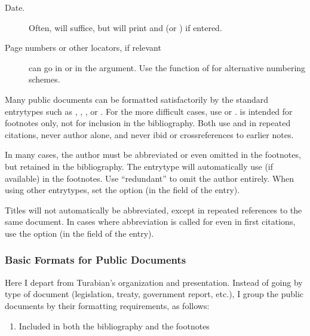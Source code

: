 \documentclass{ltxdockit}[2010/02/12]
\begin{document}
{\begin{description}
\item[Date.] Often,  will suffice, but  will print  and  (or ) if entered.

\item[Page numbers or other locators, if relevant] can go in  or in the  argument. Use the  function of  for alternative numbering schemes.

\end{description}


Many public documents can be formatted satisfactorily by the standard entrytypes such as , , , or . For the more difficult cases, use  or .   is intended for footnotes only, not for inclusion in the bibliography. Both use  and  in repeated citations, never author alone, and never ibid or crossreferences to earlier notes.


In many cases, the author must be abbreviated or even omitted in the footnotes, but retained in the bibliography. The entrytype  will automatically use  (if available) in the footnotes. Use  ``redundant'' to omit the author entirely. When using other entrytypes, set the  option (in the  field of the entry).

Titles will not automatically be abbreviated, except in repeated references to the same document. In cases where abbreviation is called for even in first citations, use the  option (in the  field of the entry).


\subsubsection{Basic Formats for Public Documents}

Here I depart from Turabian's organization and presentation. Instead of going by type of document (legislation, treaty, government report, etc.), I group the public documents by their formatting requirements, as follows:

\begin{enumerate}
	\item Included in both the bibliography and the footnotes
	\begin{enumerate}
	

\end{enumerate}
\end{enumerate}}
\end{document}
